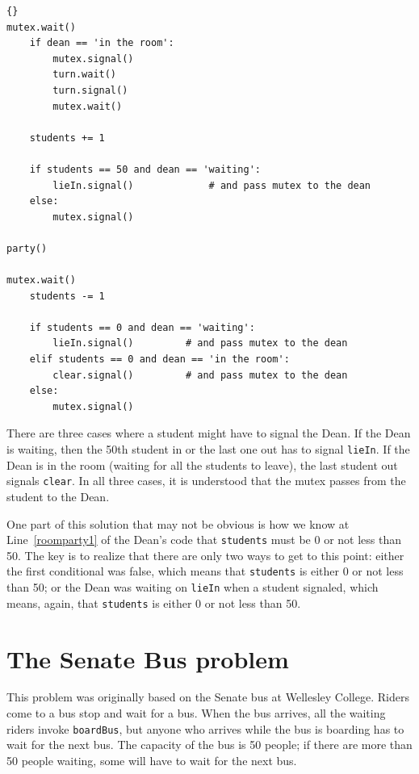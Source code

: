 \documentclass{book}
\newcommand{\clearemptydoublepage}{\newpage\cleardoublepage}
\begin{document}
\newpage
\begin{lstlisting}[caption={Room party solution (student)}]{}
mutex.wait()
    if dean == 'in the room':
        mutex.signal()
        turn.wait()
        turn.signal()
        mutex.wait()

    students += 1

    if students == 50 and dean == 'waiting':
        lieIn.signal()             # and pass mutex to the dean
    else:
        mutex.signal()

party()

mutex.wait()
    students -= 1

    if students == 0 and dean == 'waiting':
        lieIn.signal()         # and pass mutex to the dean
    elif students == 0 and dean == 'in the room':
        clear.signal()         # and pass mutex to the dean
    else:
        mutex.signal()
\end{lstlisting}

There are three cases where a student might have to signal the Dean.
If the Dean is waiting, then the 50th student in or the last one out
has to signal {\tt lieIn}.  If the Dean is in the room (waiting for
all the students to leave), the last student out signals {\tt clear}.
In all three cases, it is understood that the mutex passes from the
student to the Dean.

One part of this solution that may not be obvious is how we know at
Line~\ref{roomparty1} of the Dean's code that {\tt students} must be 0
or not less than 50.  The key is to realize that there are only two
ways to get to this point: either the first conditional was false,
which means that {\tt students} is either 0 or not less than 50; or
the Dean was waiting on {\tt lieIn} when a student signaled, which
means, again, that {\tt students} is either 0 or not less than 50.


\clearemptydoublepage
\section{The Senate Bus problem}

This problem was originally based on the Senate bus at Wellesley
College.  Riders come to a bus stop and wait for a bus.  When the bus
arrives, all the waiting riders invoke {\tt boardBus}, but anyone who
arrives while the bus is boarding has to wait for the next bus.  The
capacity of the bus is 50 people; if there are more than 50 people
waiting, some will have to wait for the next bus.
\end{document}
